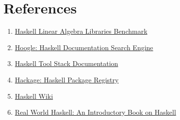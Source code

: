 \documentclass[12pt, titlepage]{article}
\begin{document}
\section{References}
\begin{enumerate}
	\item \href{https://github.com/Magalame/fastest-matrices}{Haskell Linear Algebra Libraries Benchmark}
	\item \href{https://hoogle.haskell.org/}{Hoogle: Haskell Documentation Search Engine}
	\item \href{https://docs.haskellstack.org/}{Haskell Tool Stack Documentation}
	\item \href{https://hackage.haskell.org/}{Hackage: Haskell Package Registry}
	\item \href{https://wiki.haskell.org/}{Haskell Wiki}
	\item \href{https://book.realworldhaskell.org/}{Real World Haskell: An Introductory Book on Haskell}
\end{enumerate}
\end{document}

